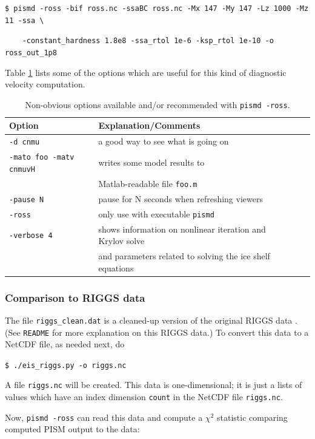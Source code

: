 \documentclass[11pt,final]{amsart}
\newcommand{\pismoptionindex}[1]{\index{options for PISM (and PETSc)!\texttt{-#1}}}
\begin{document}
\verb|$ pismd -ross -bif ross.nc -ssaBC ross.nc -Mx 147 -My 147 -Lz 1000 -Mz 11 -ssa \|

\verb|    -constant_hardness 1.8e8 -ssa_rtol 1e-6 -ksp_rtol 1e-10 -o ross_out_1p8|

\noindent Table \ref{tab:rossoptions} lists some of the options which are useful for this kind of diagnostic velocity computation.

\small
\begin{table}[ht]
\caption{Non-obvious options available and/or recommended with \texttt{pismd -ross}.}\label{tab:rossoptions}
\begin{tabular}{@{}llll}\hline
\textbf{Option} & \textbf{Explanation/Comments} \\ \hline
  \verb|-d cnmu| &       a good way to see what is going on \\
  \verb|-mato foo -matv cnmuvH|\pismoptionindex{mato}\pismoptionindex{matv} &  writes some model results to \\
    & Matlab-readable file \verb|foo.m| \\
  \verb|-pause N| &      pause for N seconds when refreshing viewers \\
  \verb|-ross| &         only use with executable \verb|pismd| \\
  \verb|-verbose 4| &      shows information on nonlinear iteration and Krylov solve \\
    & and parameters related to solving the ice shelf equations \\
\hline
\end{tabular}
\end{table}
\normalsize


\subsubsection*{Comparison to RIGGS data}  The file \verb|riggs_clean.dat| is a cleaned-up version of the original RIGGS data \cite{RIGGS1, RIGGS2}.  (See \texttt{README} for more explanation on this RIGGS data.)  To convert this data to a NetCDF file, as needed next, do

\verb|$ ./eis_riggs.py -o riggs.nc|

\noindent A file \verb|riggs.nc| will be created.  This data is one-dimensional; it is just a lists of values which have an index dimension \verb|count| in the NetCDF file \verb|riggs.nc|.

Now, \verb|pismd -ross| can read this data and compute a $\chi^2$ statistic comparing computed PISM output to the data:
\end{document}
